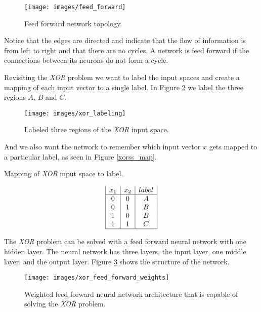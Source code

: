 \begin{figure}[htb!]
  \centering
  \texttt{[image: images/feed\_forward]}
  \caption{Feed forward network topology.}
  \label{ff}
\end{figure}

Notice that the edges are directed and indicate that the flow of information is from left to right and that there are no cycles.
A network is feed forward if the connections between its neurons do not form a cycle.

Revisiting the {\it XOR} problem we want to label the input spaces
and create a mapping of each input vector to a single label.
In Figure \ref{xor_label} we label the three regions $A$, $B$ and $C$.

\begin{figure}[htb!]
  \centering
  \texttt{[image: images/xor\_labeling]}
  \caption{Labeled three regions of the {\it XOR} input space.}
  \label{xor_label}
\end{figure}

And we also want the network to remember which input vector $x$ gets mapped to a
particular label, as seen in Figure \ref{xorss_map}.

\begin{table}[htb!]
\caption{Mapping of {\it XOR} input space to label.}
\label{xorss_map}
\begin{displaymath}
\begin{array}{|c|c|c|}
   x_1
 & x_2
 & label
\\
\hline
0 & 0 & A\\
0 & 1 & B\\
1 & 0 & B\\
1 & 1 & C\\
\hline
\end{array}
\end{displaymath}
\end{table}

The {\it XOR} problem can be solved with a feed forward neural network with
one hidden layer.
The neural network has three layers, the input layer, one middle
layer, and the output layer.
Figure \ref{xffw} shows the structure of the
network.

\begin{figure}[htb!]
  \centering
  \texttt{[image: images/xor\_feed\_forward\_weights]}
  \caption{Weighted feed forward neural network architecture that is
    capable of solving the {\it XOR}
    problem.}
  \label{xffw}
\end{figure}

